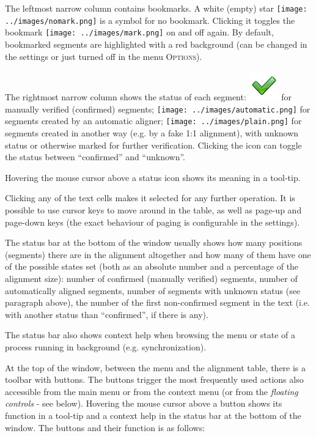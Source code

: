 \documentclass[a4paper,10pt,oneside]{book}
\newcommand{\menu}[1]{\textsc{#1}}
\begin{document}
The leftmost narrow column contains bookmarks. A white (empty) star \texttt{[image: ../images/nomark.png]} is a symbol for no bookmark. Clicking it toggles the bookmark \texttt{[image: ../images/mark.png]} on and off again. By default, bookmarked segments are highlighted with a red background (can be changed in the settings or just turned off in the menu \menu{Options}).

The rightmost narrow column shows the status of each segment: \includegraphics[height=1.5ex]{../images/48/confirmed.png} for manually verified (confirmed) segments; \texttt{[image: ../images/automatic.png]} for segments created by an automatic aligner; \texttt{[image: ../images/plain.png]} for segments created in another way (e.g. by a fake 1:1 alignment), with unknown status or otherwise marked for further verification. Clicking the icon can toggle the status between ``confirmed'' and ``unknown''.

Hovering the mouse cursor above a status icon shows its meaning in a tool-tip.

Clicking any of the text cells makes it selected for any further operation. It is possible to use cursor keys to move around in the table, as well as page-up and page-down keys (the exact behaviour of paging is configurable in the settings).

The status bar at the bottom of the window usually shows how many positions (segments) there are in the alignment altogether and how many of them have one of the possible states set (both as an absolute number and a percentage of the alignment size): number of confirmed (manually verified) segments, number of automatically aligned segments, number of segments with unknown status (see paragraph above), the number of the first non-confirmed segment in the text (i.e. with another status than ``confirmed'', if there is any).

The status bar also shows context help when browsing the menu or state of a process running in background (e.g. synchronization).

At the top of the window, between the menu and the alignment table, there is a toolbar with buttons. The buttons trigger the most frequently used actions also accessible from the main menu or from the context menu (or from the \emph{floating controls} - see below). Hovering the mouse cursor above a button shows its function in a tool-tip and a context help in the status bar at the bottom of the window. The buttons and their function is as follows:
\end{document}
